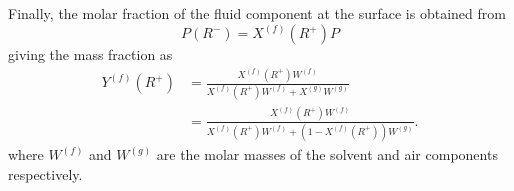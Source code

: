 \documentclass[12pt,twoside]{report}
\begin{document}
Finally, the molar fraction of the fluid component at the surface is obtained from
\begin{equation}
  P(R^-) = X^{(f)}(R^+) P
\end{equation}
giving the mass fraction as
\begin{equation}
  \begin{aligned}
    Y^{(f)}(R^+) &=
    \frac{X^{(f)}(R^+) W^{(f)}}{X^{(f)}(R^+) W^{(f)} + X^{(g)} W^{(g)}} \\
    &=
    \frac{X^{(f)}(R^+) W^{(f)}}{X^{(f)}(R^+) W^{(f)} + (1 - X^{(f)}(R^+)) W^{(g)}}.
  \end{aligned}
\end{equation}
where $W^{(f)}$ and $W^{(g)}$ are the molar masses of the solvent and air components respectively.


\end{document}
